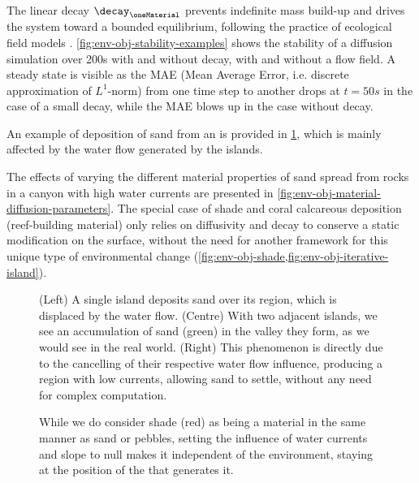 The linear decay $\decay_\oneMaterial$ prevents indefinite mass build-up and drives the system toward a bounded equilibrium, following the practice of ecological field models \cite{Seidl2012}. \cref{fig:env-obj-stability-examples} shows the stability of a diffusion simulation over 200s with and without decay, with and without a flow field. A steady state is visible as the MAE (Mean Average Error, i.e. discrete approximation of $L^1$-norm) from one time step to another drops at $t=50s$ in the case of a small decay, while the MAE blows up in the case without decay.


An example of deposition of sand from an  is provided in \cref{fig:env-obj-double-island-sand-deposition}, which is mainly affected by the water flow generated by the islands.

The effects of varying the different material properties of sand spread from rocks in a canyon with high water currents are presented in \cref{fig:env-obj-material-diffusion-parameters}. The special case of shade and coral calcareous deposition (reef-building material) only relies on diffusivity and decay to conserve a static modification on the surface, without the need for another framework for this unique type of environmental change (\cref{fig:env-obj-shade,fig:env-obj-iterative-island}).

\begin{figure}
    \caption{(Left) A single island deposits sand over its region, which is displaced by the water flow. (Centre) With two adjacent islands, we see an accumulation of sand (green) in the valley they form, as we would see in the real world. (Right) This phenomenon is directly due to the cancelling of their respective water flow influence, producing a region with low currents, allowing sand to settle, without any need for complex computation.}
    \label{fig:env-obj-double-island-sand-deposition}
\end{figure}

\begin{figure}
    \caption{While we do consider shade (red) as being a material in the same manner as sand or pebbles, setting the influence of water currents and slope to null makes it independent of the environment, staying at the position of the  that generates it.}
    \label{fig:env-obj-shade}
\end{figure}

